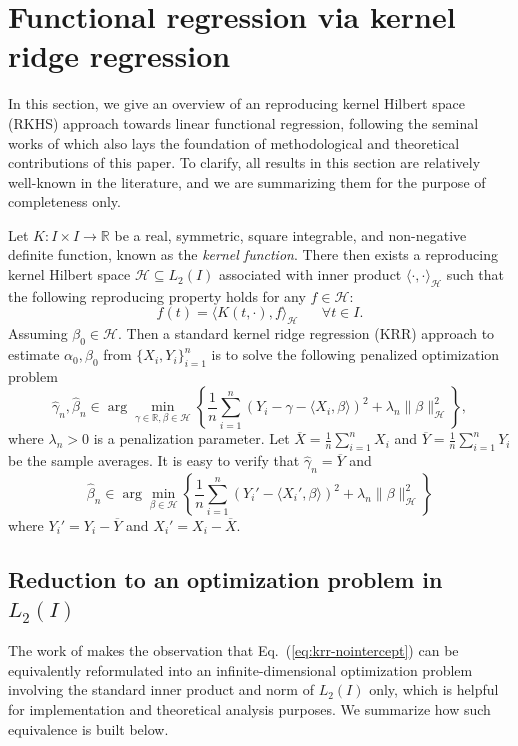 \documentclass[11pt,a4paper]{article}
\renewcommand{\hat}{\widehat}
\renewcommand{\bar}{\overline}
\theoremstyle{definition}
\theoremstyle{plain}
\theoremstyle{remark}
\newcommand{\mH}{\mathcal H}
\begin{document}
\section{Functional regression via kernel ridge regression}

In this section, we give an overview of an reproducing kernel Hilbert space (RKHS) approach towards linear functional regression, following the seminal works of \cite{cai2012minimax} which also lays the foundation of 
methodological and theoretical contributions of this paper.
To clarify, all results in this section are relatively well-known in the literature, and we are summarizing them for the purpose of completeness only.

Let $K:I\times I\to\mathbb R$ be a real, symmetric, square integrable, and non-negative definite function, known as the \emph{kernel function}.
There then exists a reproducing kernel Hilbert space $\mH\subseteq L_2(I)$ associated with inner product $\langle\cdot,\cdot\rangle_{\mH}$
such that the following reproducing property holds for any $f\in\mH$:
$$
f(t) = \langle K(t,\cdot), f\rangle_{\mH}\;\;\;\;\;\;\forall t\in I.
$$
Assuming $\beta_0\in\mH$. Then a standard kernel ridge regression (KRR) approach to estimate $\alpha_0,\beta_0$ from $\{X_i,Y_i\}_{i=1}^n$ is to solve the following penalized optimization problem
\begin{equation}
\hat\gamma_n,\hat\beta_n \in \arg\min_{\gamma\in\mathbb R,\beta\in\mH} \left\{\frac{1}{n}\sum_{i=1}^n (Y_i-\gamma-\langle X_i,\beta\rangle)^2 + \lambda_n \|\beta\|_\mH^2\right\},
\label{eq:krr}
\end{equation}
where $\lambda_n>0$ is a penalization parameter.
Let $\bar X=\frac{1}{n}\sum_{i=1}^n X_i$ and $\bar Y=\frac{1}{n}\sum_{i=1}^n Y_i$ be the sample averages. It is easy to verify that $\hat\gamma_n=\bar Y$ and 
\begin{equation}
\hat\beta_n\in\arg\min_{\beta\in\mH}\left\{\frac{1}{n}\sum_{i=1}^n (Y_i'-\langle X_i',\beta\rangle)^2 + \lambda_n\|\beta\|_\mH^2\right\}
\label{eq:krr-nointercept}
\end{equation}
where $Y_i'=Y_i-\bar Y$ and $X_i'=X_i-\bar X$.

\subsection{Reduction to an optimization problem in $L_2(I)$}

The work of \cite{cai2012minimax} makes the observation that Eq.~(\ref{eq:krr-nointercept}) can be equivalently reformulated into an infinite-dimensional optimization problem
involving the standard inner product and norm of $L_2(I)$ only, which is helpful for implementation and theoretical analysis purposes.
We summarize how such equivalence is built below.
\end{document}
